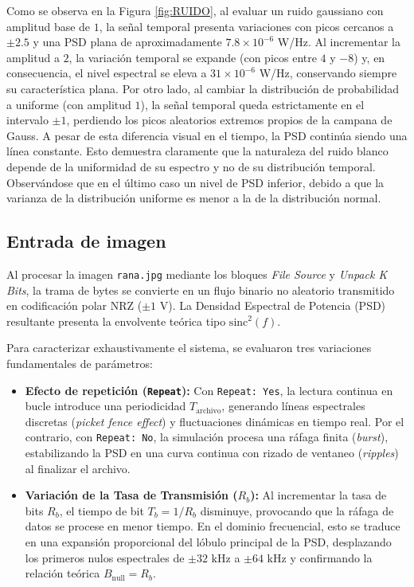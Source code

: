 \documentclass[twocolumn]{IEEEtran}
\begin{document}
Como se observa en la Figura \ref{fig:RUIDO}, al evaluar un ruido gaussiano con amplitud base de $1$, la señal temporal presenta variaciones con picos cercanos a $\pm 2.5$ y una PSD plana de aproximadamente $7.8 \times 10^{-6}$ W/Hz. Al incrementar la amplitud a $2$, la variación temporal se expande (con picos entre $4$ y $-8$) y, en consecuencia, el nivel espectral se eleva a $31 \times 10^{-6}$ W/Hz, conservando siempre su característica plana. Por otro lado, al cambiar la distribución de probabilidad a uniforme (con amplitud $1$), la señal temporal queda estrictamente en el intervalo $\pm 1$, perdiendo los picos aleatorios extremos propios de la campana de Gauss. A pesar de esta diferencia visual en el tiempo, la PSD continúa siendo una línea constante. Esto demuestra claramente que la naturaleza del ruido blanco depende de la uniformidad de su espectro y no de su distribución temporal. Observándose que en el último caso un nivel de PSD inferior, debido a que la varianza de la distribución uniforme es menor a la de la distribución normal.


\subsection{Entrada de imagen}

Al procesar la imagen \texttt{rana.jpg} mediante los bloques \textit{File Source} y \textit{Unpack K Bits}, la trama de bytes se convierte en un flujo binario no aleatorio transmitido en codificación polar NRZ ($\pm 1\text{ V}$). La Densidad Espectral de Potencia (PSD) resultante presenta la envolvente teórica tipo $\text{sinc}^2(f)$.

Para caracterizar exhaustivamente el sistema, se evaluaron tres variaciones fundamentales de parámetros:

\begin{itemize}
    \item \textbf{Efecto de repetición (\texttt{Repeat}):} Con \texttt{Repeat: Yes}, la lectura continua en bucle introduce una periodicidad $T_{\text{archivo}}$, generando líneas espectrales discretas (\textit{picket fence effect}) y fluctuaciones dinámicas en tiempo real. Por el contrario, con \texttt{Repeat: No}, la simulación procesa una ráfaga finita (\textit{burst}), estabilizando la PSD en una curva continua con rizado de ventaneo (\textit{ripples}) al finalizar el archivo.
    
    \item \textbf{Variación de la Tasa de Transmisión ($R_b$):} Al incrementar la tasa de bits $R_b$, el tiempo de bit $T_b = 1/R_b$ disminuye, provocando que la ráfaga de datos se procese en menor tiempo. En el dominio frecuencial, esto se traduce en una expansión proporcional del lóbulo principal de la PSD, desplazando los primeros nulos espectrales de $\pm 32\text{ kHz}$ a $\pm 64\text{ kHz}$ y confirmando la relación teórica $B_{\text{null}} = R_b$.
\end{itemize}
\end{document}
